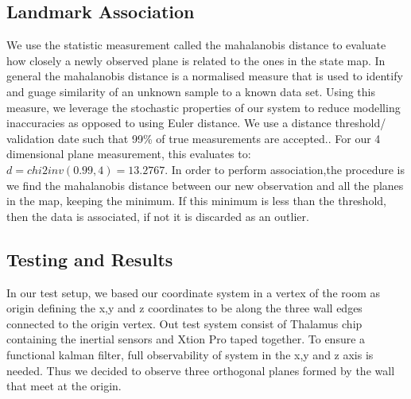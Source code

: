 \documentclass[]{article}
\begin{document}
{\subsection{Landmark Association} %
\label{sub:landmark_association}
We use the statistic measurement called the mahalanobis distance to evaluate how closely a newly observed plane is related to the ones in the state map. In general the mahalanobis distance is a normalised measure that is used to identify and guage similarity of an unknown sample to a known data set. Using this measure, we leverage the stochastic properties of our system to reduce modelling inaccuracies as opposed to using Euler distance. We use a distance threshold/ validation date such that 99\% of true measurements are accepted.. For our 4 dimensional plane measurement, this evaluates to:
$ d = chi2inv(0.99,4) = 13.2767$. In order to perform association,the procedure is we find the mahalanobis distance between our new observation and all the planes in the map, keeping the minimum. If this minimum is less than the threshold, then the data is associated, if not it is discarded as an outlier.

\subsection{Testing and Results} %
\label{sub:testing_kalman}
In our test setup, we based our coordinate system in a vertex of the room as origin defining the x,y and z coordinates to be along the three wall edges connected to the origin vertex. Out test system consist of Thalamus chip containing the inertial sensors and Xtion Pro taped together. To ensure a functional kalman filter, full observability of system in the x,y and z axis is needed. Thus we decided to observe three orthogonal planes formed by the wall that meet at the origin. 

}
\end{document}
